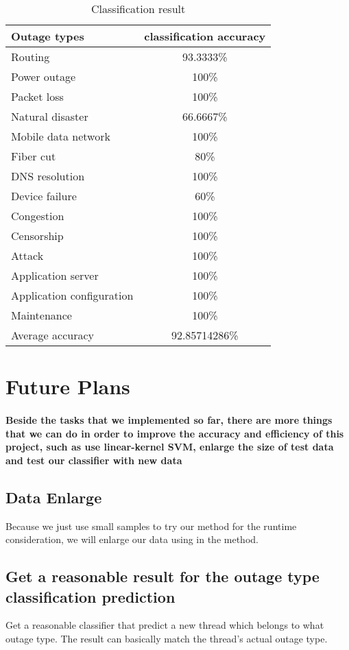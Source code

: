 \documentclass{sig-alternate}
\begin{document}
\begin{table}[h]
\centering
\begin{tabular}{ | l || c | }
  \hline
  Outage types & classification accuracy \\
  \hline
  Routing & 93.3333\% \\
  \hline
  Power outage & 100\%  \\
  \hline
  Packet loss & 100\%  \\
  \hline
  Natural disaster & 66.6667\%  \\
  \hline
  Mobile data network & 100\%  \\
  \hline
  Fiber cut & 80\%  \\
  \hline
  DNS resolution & 100\%  \\
  \hline
  Device failure & 60\%  \\
  \hline
  Congestion & 100\%  \\
  \hline
  Censorship & 100\%   \\
  \hline
  Attack & 100\%   \\
  \hline
  Application server & 100\%   \\
  \hline
  Application configuration & 100\%   \\
  \hline
  Maintenance & 100\%   \\
  \hline
  Average accuracy & 92.85714286\%   \\
  \hline
\end{tabular}
\caption{Classification result}\label{table:classification}
\end{table}

\section{Future Plans}
\paragraph{Beside the tasks that we implemented so far, there are more things that we can do in order to improve the accuracy and efficiency of this project, such as use linear-kernel SVM, enlarge the size of test data and test our classifier with new data}

\subsection{Data Enlarge}
Because we just use small samples to try our method for the runtime consideration, we will enlarge our data using in the method.
\subsection{Get a reasonable result for the outage type classification prediction}
Get a reasonable classifier that predict a new thread which belongs to what outage type. The result can basically match the thread’s actual  outage type.
\end{document}
